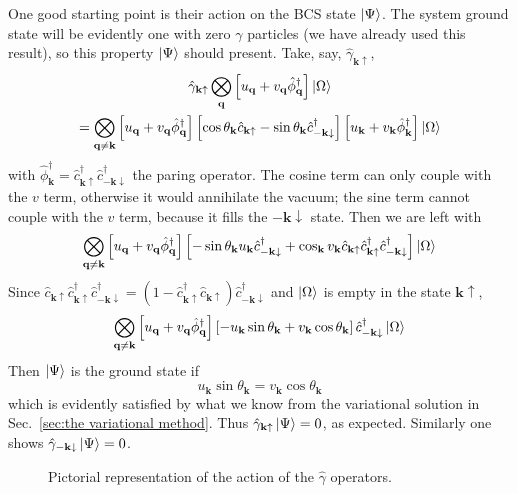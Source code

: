 One good starting point is their action on the BCS state $\ket{\Psi}$. The system ground state will be evidently one with zero $\gamma$ particles (we have already used this result), so this property $\ket{\Psi}$ should present. Take, say, $\hat{\gamma}_{\mathbf{k}\uparrow}$,
\begin{multline*}
	\hat{\gamma}_{\mathbf{k}\uparrow} \bigotimes_\mathbf{q} \left[{u_\mathbf{q} + v_\mathbf{q} \hat{\phi}_\mathbf{q}^\dagger}\right] \ket{\Omega} \\ = \bigotimes_{\mathbf{q}\neq\mathbf{k}} \left[{u_\mathbf{q} + v_\mathbf{q} \hat{\phi}_\mathbf{q}^\dagger}\right] \left[{\cos\theta_\mathbf{k} \hat{c}_{\mathbf{k}\uparrow} - \sin\theta_\mathbf{k} \hat{c}_{-\mathbf{k}\downarrow}^\dagger}\right] \left[{u_\mathbf{k} + v_\mathbf{k} \hat{\phi}_\mathbf{k}^\dagger}\right] \ket{\Omega}
\end{multline*}
with $\hat{\phi}_\mathbf{k}^\dagger = \hat{c}_{\mathbf{k}\uparrow}^\dagger \hat{c}_{-\mathbf{k}\downarrow}^\dagger$ the paring operator. The cosine term can only couple with the $v$ term, otherwise it would annihilate the vacuum; the sine term cannot couple with the $v$ term, because it fills the $-\mathbf{k}\downarrow$ state. Then we are left with
\[
	\bigotimes_{\mathbf{q}\neq\mathbf{k}} \left[{u_\mathbf{q} + v_\mathbf{q} \hat{\phi}_\mathbf{q}^\dagger}\right] \left[{- \sin\theta_\mathbf{k} u_\mathbf{k} \hat{c}_{-\mathbf{k}\downarrow}^\dagger + \cos_\mathbf{k} v_\mathbf{k} \hat{c}_{\mathbf{k}\uparrow} \hat{c}_{\mathbf{k}\uparrow}^\dagger \hat{c}_{-\mathbf{k}\downarrow}^\dagger}\right] \ket{\Omega}
\]
Since $\hat{c}_{\mathbf{k}\uparrow} \hat{c}_{\mathbf{k}\uparrow}^\dagger \hat{c}_{-\mathbf{k}\downarrow}^\dagger = (1 - \hat{c}_{\mathbf{k}\uparrow}^\dagger \hat{c}_{\mathbf{k}\uparrow}) \hat{c}_{-\mathbf{k}\downarrow}^\dagger$ and $\ket{\Omega}$ is empty in the state $\mathbf{k}\uparrow$,
\[
	\bigotimes_{\mathbf{q}\neq\mathbf{k}} \left[{u_\mathbf{q} + v_\mathbf{q} \hat{\phi}_\mathbf{q}^\dagger}\right] \left[{- u_\mathbf{k} \sin\theta_\mathbf{k}  + v_\mathbf{k} \cos\theta_\mathbf{k}}\right] \hat{c}_{-\mathbf{k}\downarrow}^\dagger \ket{\Omega}
\]
Then $\ket{\Psi}$ is the ground state if
\[
	u_\mathbf{k} \sin\theta_\mathbf{k} = v_\mathbf{k} \cos\theta_\mathbf{k}
\]
which is evidently satisfied by what we know from the variational solution in Sec.~\ref{sec:the variational method}. Thus $\hat{\gamma}_{\mathbf{k}\uparrow} \ket{\Psi} = 0$, as expected. Similarly one shows $\hat{\gamma}_{-\mathbf{k}\downarrow} \ket{\Psi} = 0$.

\begin{figure}
	\centering
	
	\caption{Pictorial representation of the action of the $\hat{\gamma}$ operators.}
	\label{fig:bogoliubov fermions}
\end{figure}

